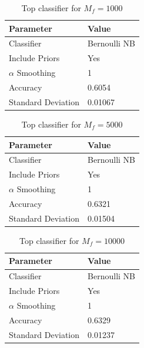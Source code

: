 \documentclass[11pt]{article}
\begin{document}
\begin{table}[!h]
	\begin{center}
		\begin{tabular}{|l|l|}			
			\hline
			Parameter & Value \\
			\hline\hline
			Classifier & Bernoulli NB \\
			Include Priors & Yes \\
			$\alpha$ Smoothing & 1 \\
			\hline\hline
			Accuracy &  0.6054\\
			Standard Deviation &  0.01067 \\
			\hline
		\end{tabular}
		\caption{Top classifier for $M_f = 1000$}
		\label{tbl:mf1000}
	\end{center}
\end{table}


\begin{table}[!h]
	\begin{center}
		\begin{tabular}{|l|l|}			
			\hline
			Parameter & Value \\
			\hline\hline
			Classifier & Bernoulli NB \\
			Include Priors & Yes \\
			$\alpha$ Smoothing & 1 \\
			\hline\hline
			Accuracy &  0.6321\\
			Standard Deviation &  0.01504 \\
			\hline
		\end{tabular}
		\caption{Top classifier for $M_f = 5000$}
		\label{tbl:mf5000}
	\end{center}
\end{table}

\begin{table}[!h]
	\begin{center}
		\begin{tabular}{|l|l|}			
			\hline
			Parameter & Value \\
			\hline\hline
			Classifier & Bernoulli NB \\
			Include Priors & Yes \\
			$\alpha$ Smoothing & 1 \\
			\hline\hline
			Accuracy &  0.6329\\
			Standard Deviation &   0.01237 \\
			\hline
		\end{tabular}
		\caption{Top classifier for $M_f = 10000$}
		\label{tbl:mf10000}
	\end{center}
\end{table}
\end{document}
